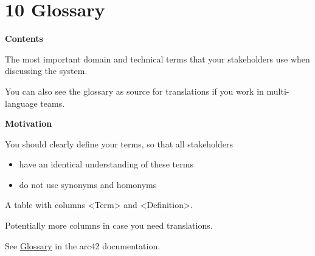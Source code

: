 \hypertarget{section-glossary}{%
\section{10 Glossary}\label{section-glossary}}

\textbf{Contents}

The most important domain and technical terms that your stakeholders use
when discussing the system.

You can also see the glossary as source for translations if you work in
multi-language teams.

\textbf{Motivation}

You should clearly define your terms, so that all stakeholders

\begin{itemize}
\item
  have an identical understanding of these terms
\item
  do not use synonyms and homonyms
\end{itemize}

A table with columns \textless Term\textgreater{} and
\textless Definition\textgreater.

Potentially more columns in case you need translations.

See \href{https://docs.arc42.org/section-12/}{Glossary} in the arc42
documentation.

